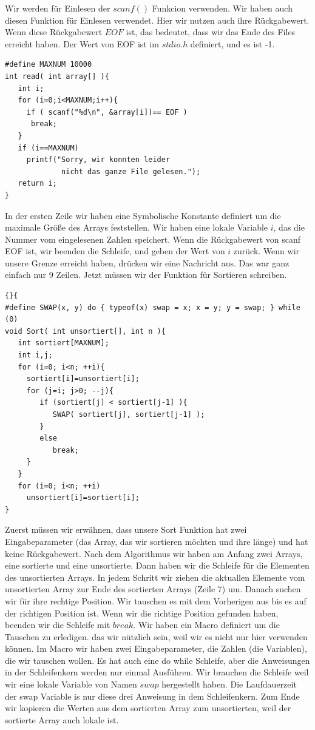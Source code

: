 \documentclass{article}[12pt]
\newenvironment{myexampleprogram}[1]{%
    \tcolorbox[beamer,%
    noparskip,breakable,
    colback=White,colframe=Goldenrod,%
    colbacklower=Yellow!75!White,%
    title=#1]}%
    {\endtcolorbox}
\begin{document}
\begin{myexampleprogram}{ Programme: \texttt{Einfügesortieren}}
Wir werden für Einlesen der $scanf()$ Funkcion verwenden. Wir haben auch diesen Funktion für 
Einlesen verwendet. Hier wir nutzen auch ihre Rückgabewert. Wenn diese Rückgabewert $EOF$ ist, 
das bedeutet, dass wir das Ende des Files erreicht haben. Der Wert von EOF ist im $stdio.h$ definiert, 
und es ist -1.
\begin{lstlisting}
#define MAXNUM 10000
int read( int array[] ){
   int i;
   for (i=0;i<MAXNUM;i++){
     if ( scanf("%d\n", &array[i])== EOF )
      break;
   }
   if (i==MAXNUM)
     printf("Sorry, wir konnten leider
             nicht das ganze File gelesen.");
   return i;
}
\end{lstlisting} 
In der ersten Zeile wir haben eine Symbolische Konstante definiert um die maximale Größe des
Arrays feststellen. Wir haben eine lokale Variable $i$, das die Nummer vom eingelesenen Zahlen speichert.
Wenn die Rückgabewert von scanf EOF ist, wir beenden die Schleife, und geben der Wert von $i$ zurück.
Wenn wir unsere Grenze erreicht haben, drücken wir eine Nachricht aus.
Das war ganz einfach nur 9 Zeilen. Jetzt müssen wir der Funktion für Sortieren schreiben.
\begin{lstlisting}{}{
#define SWAP(x, y) do { typeof(x) swap = x; x = y; y = swap; } while (0)
void Sort( int unsortiert[], int n ){
   int sortiert[MAXNUM];
   int i,j;
   for (i=0; i<n; ++i){
     sortiert[i]=unsortiert[i];
     for (j=i; j>0; --j){
        if (sortiert[j] < sortiert[j-1] ){
           SWAP( sortiert[j], sortiert[j-1] );
        }
        else
           break;
     }
   }
   for (i=0; i<n; ++i)
     unsortiert[i]=sortiert[i];
}
\end{lstlisting}
Zuerst müssen wir erwähnen, dass unsere Sort Funktion hat zwei Eingabeparameter (das Array, das
wir sortieren möchten und ihre länge) und hat keine Rückgabewert. Nach dem Algorithmus 
wir haben am Anfang zwei Arrays, eine sortierte und eine unsortierte. Dann haben wir die Schleife für die 
Elementen des unsortierten Arrays. In jedem Schritt wir ziehen die aktuallen Elemente vom unsortierten Array
zur Ende des sortierten Arrays (Zeile 7) um. Danach suchen wir für ihre rechtige  Position.
Wir tauschen es mit dem Vorherigen aus bis es auf der richtigen Position ist. Wenn wir die richtige 
Position gefunden haben, beenden wir die Schleife mit $break$.
Wir haben ein Macro definiert um die Tauschen zu erledigen. das wir nützlich sein, weil wir es nicht nur
hier verwenden können. Im Macro wir haben zwei Eingabeparameter, die Zahlen (die Variablen), die wir tauschen 
wollen. Es hat auch eine do while Schleife, aber die Anweisungen in der Schleifenkern werden nur einmal Ausführen. 
Wir brauchen die Schleife weil wir eine lokale Variable von Namen $swap$ hergestellt haben. Die
Laufdauerzeit der swap Variable is nur diese drei Anweisung in dem Schleifenkern. Zum Ende 
wir kopieren die Werten aus dem sortierten Array zum unsortierten, weil der sortierte Array auch lokale ist.


\end{myexampleprogram}
\end{document}
